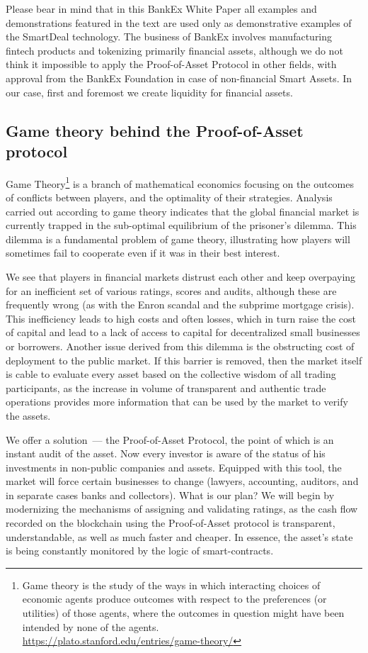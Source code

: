 \documentclass{article}
\begin{document}
\begin{multicols}{2}
Please bear in mind that in this BankEx White Paper all examples and demonstrations featured in the text are used only as demonstrative examples of the SmartDeal technology. The business of BankEx involves manufacturing fintech products and tokenizing primarily financial assets, although we do not think it impossible to apply the Proof-of-Asset Protocol in other fields, with approval from the BankEx Foundation in case of non-financial Smart Assets. In our case, first and foremost we create liquidity for financial assets.

\subsection{Game theory behind the Proof-of-Asset protocol}

Game Theory\footnote{Game theory is the study of the ways in which interacting choices of economic agents produce outcomes with respect to the preferences (or utilities) of those agents, where the outcomes in question might have been intended by none of the agents.\\\url{https://plato.stanford.edu/entries/game-theory/}} is a branch of mathematical economics focusing on the outcomes of conflicts between players, and the optimality of their strategies. Analysis carried out according to game theory indicates that the global financial market is currently trapped in the sub-optimal equilibrium of the prisoner’s dilemma. This dilemma is a fundamental problem of game theory, illustrating how players will sometimes fail to cooperate even if it was in their best interest.

We see that players in financial markets distrust each other and keep overpaying for an inefficient set of various ratings, scores and audits, although these are frequently wrong (as with the Enron scandal and the subprime mortgage crisis). This inefficiency leads to high costs and often losses, which in turn raise the cost of capital and lead to a lack of access to capital for decentralized small businesses or borrowers. Another issue derived from this dilemma is the obstructing cost of deployment to the public market. If this barrier is removed, then the market itself is cable to evaluate every asset based on the collective wisdom of all trading participants, as the increase in volume of transparent and authentic trade operations provides more information that can be used by the market to verify the assets.

We offer a solution~--- the Proof-of-Asset Protocol, the point of which is an instant audit of the asset. Now every investor is aware of the status of his investments in non-public companies and assets. Equipped with this tool, the market will force certain businesses to change (lawyers, accounting, auditors, and in separate cases banks and collectors). What is our plan? We will begin by modernizing the mechanisms of assigning and validating ratings, as the cash flow recorded on the blockchain using the Proof-of-Asset protocol is transparent, understandable, as well as much faster and cheaper. In essence, the asset’s state is being constantly monitored by the logic of smart-contracts.  


\end{multicols}
\end{document}
